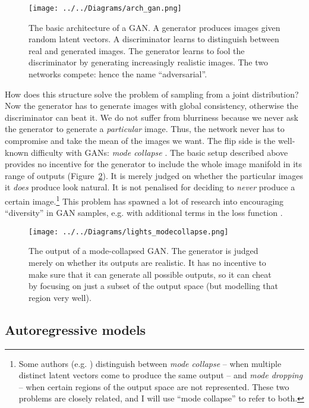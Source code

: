 \documentclass[11pt, a4paper, openany]{book}
\newcommand{\nquote}[1]{``{#1}''}
\begin{document}
\begin{figure}
  \centering
  \texttt{[image: ../../Diagrams/arch\_gan.png]}
  \caption[Architecture of a GAN]{The basic architecture of a GAN. A generator produces images given random latent vectors. A discriminator learns to distinguish between real and generated images. The generator learns to fool the discriminator by generating increasingly realistic images. The two networks compete: hence the name \nquote{adversarial}.}
  \label{archgan}
\end{figure}

How does this structure solve the problem of sampling from a joint distribution? Now the generator has to generate images with global consistency, otherwise the discriminator can beat it. We do not suffer from blurriness because we never ask the generator to generate a \emph{particular} image. Thus, the network never has to compromise and take the mean of the images we want. The flip side is the well-known difficulty with GANs: \emph{mode collapse} \citep{gantechniques}. The basic setup described above provides no incentive for the generator to include the whole image manifold in its range of outputs (Figure~\ref{modecollapse}). It is merely judged on whether the particular images it \emph{does} produce look natural. It is not penalised for deciding to \emph{never} produce a certain image.\footnote{Some authors (e.g. \citet{ganmetrics}) distinguish between \emph{mode collapse} -- when multiple distinct latent vectors come to produce the same output -- and \emph{mode dropping} -- when certain regions of the output space are not represented. These two problems are closely related, and I will use \nquote{mode collapse} to refer to both.} This problem has spawned a lot of research into encouraging \nquote{diversity} in GAN samples, e.g. with additional terms in the loss function \citep{gantechniques,energygan,unrolledgan,wgan}.

\begin{figure}
  \centering
  \texttt{[image: ../../Diagrams/lights\_modecollapse.png]}
  \caption[Output of a mode-collapsed GAN]{The output of a mode-collapsed GAN. The generator is judged merely on whether its outputs are realistic. It has no incentive to make sure that it can generate all possible outputs, so it can cheat by focusing on just a subset of the output space (but modelling that region very well).}
  \label{modecollapse}
\end{figure}

\subsection{Autoregressive models}
\end{document}
